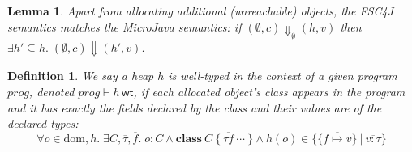\documentclass{article}
\newtheorem{lemma}{Lemma}
\newtheorem{definition}{Definition}
\begin{document}

\begin{lemma}
Apart from allocating additional (unreachable) objects, the FSC4J semantics matches the MicroJava semantics:
if $(\emptyset, c) \Downarrow_\emptyset (h, v)$ then $\exists h' \subseteq h.\;(\emptyset, c) \Downarrow (h', v)$.
\end{lemma}

\begin{definition}
We say a heap $h$ is \emph{well-typed} in the context of a given program $\mathit{prog}$, denoted $\mathit{prog} \vdash h\,\mathsf{wt}$, if each allocated object's class appears in the program and it has exactly the fields declared by the class and their values are of the declared types:
$$\forall o \in \mathrm{dom},h.\;\exists C, \overline{\tau}, \overline{f}.\;o : C \land \mathbf{class}\ C\ \{\ \overline{\tau f}\ \cdots\ \} \land h(o) \in \{\{\overline{f\mapsto v}\}\ |\ \overline{v : \tau}\}$$
\end{definition}
\end{document}
